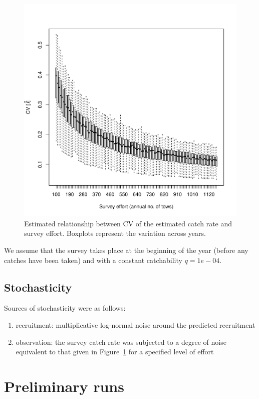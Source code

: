 \documentclass[a4paper]{article}
\begin{document}
\begin{figure}
\centering
\includegraphics{../dat/effCV.pdf}
\caption{Estimated relationship between CV of the estimated catch rate and survey effort. Boxplots represent the variation across years.}
\label{fig:effCV}
\end{figure} 


We assume that the survey takes place at the beginning of the year (before any catches have been taken)
and with a constant catchability $q=1e-04$. 

\subsection{Stochasticity}


Sources of stochasticity were as follows:
\begin{enumerate}
\item recruitment: multiplicative log-normal noise around the predicted recruitment
\item observation: the survey catch rate was subjected to a degree of noise equivalent to that given in Figure~\ref{fig:effCV}
for a specified level of effort
\end{enumerate}

\section{Preliminary runs}
\end{document}
